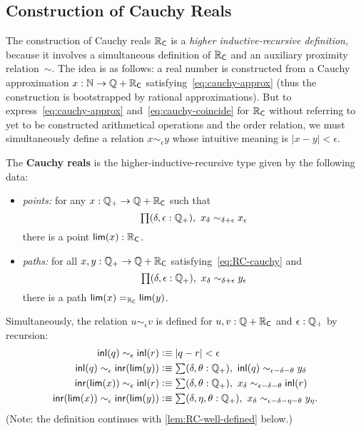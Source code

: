 \subsection{Construction of Cauchy Reals}
\label{sec:constr-cauchy-reals}

The construction of Cauchy reals $\RC$ is a \emph{higher inductive-recursive definition},
because it involves a simultaneous definition of $\RC$ and an auxiliary proximity
relation~$\sim$. The idea is as follows: a real number is constructed from a Cauchy
approximation $x : \N \to \Q + \RC$ satisfying~\eqref{eq:cauchy-approx} (thus the
construction is bootstrapped by rational approximations). But to
express~\eqref{eq:cauchy-approx} and~\eqref{eq:cauchy-coincide} for $\RC$ without
referring to yet to be constructed arithmetical operations and the order relation, we must
simultaneously define a relation $x \sim_\epsilon y$ whose intuitive meaning is $|x - y| <
\epsilon$.

\begin{defn}\label{defn:cauchy-reals}
  The \textbf{Cauchy reals \RC} is the higher-inductive-recursive type given by the following data:
  \begin{itemize}
  \item \emph{points:} for any $x : \Qp \to \Q + \RC$ such that
    \begin{equation}
      \label{eq:RC-cauchy}
      \prd{\delta, \epsilon : \Qp} x_\delta \sim_{\delta + \epsilon} x_\epsilon
    \end{equation}
    there is a point $\rclim(x) : \RC$.
  \item \emph{paths:} for all $x, y : \Qp \to \Q + \RC$ satisfying~\eqref{eq:RC-cauchy} and
    \begin{equation}
      \label{eq:RC-coincide}
      \prd{\delta, \epsilon : \Qp} x_\delta \sim_{\delta + \epsilon} y_\epsilon
    \end{equation}
    there is a path $\id[\RC]{\rclim(x)}{\rclim(y)}$.
  \end{itemize}
  Simultaneously, the relation $u \sim_\epsilon v$ is defined for $u, v : \Q + \RC$ and
  $\epsilon : \Qp$ by recursion:
  \begin{align*}
    \inl(q) \sim_\epsilon \inl(r)  &\defeq
    |q - r| < \epsilon
    \\
    \inl(q) \sim_\epsilon \inr(\rclim(y)) &\defeq
    \sm{\delta, \theta : \Qp} \inl(q) \sim_{\epsilon - \delta - \theta} y_\delta
    \\
    \inr(\rclim(x)) \sim_\epsilon \inl(r) &\defeq
    \sm{\delta, \theta : \Qp} x_\delta \sim_{\epsilon - \delta - \theta} \inl(r)
    \\
    \inr(\rclim(x)) \sim_\epsilon \inr(\rclim(y)) &\defeq
    \sm{\delta, \eta, \theta : \Qp} x_\delta \sim_{\epsilon - \delta - \eta - \theta} y_\eta.
  \end{align*}  
  (Note: the definition continues with \autoref{lem:RC-well-defined} below.)
\end{defn}


